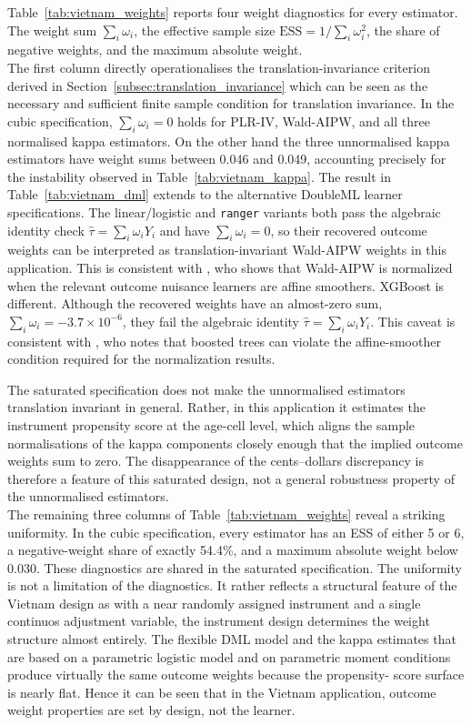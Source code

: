 \documentclass[12pt, a4paper, oneside]{article}
\theoremstyle{plain}
\theoremstyle{definition}
\begin{document}
Table~\ref{tab:vietnam_weights} reports four weight diagnostics for every
estimator. The weight sum $\sum_i \omega_i$, the effective sample size
$\text{ESS} = 1/\sum_i \omega_i^2$, the share of negative weights, and the
maximum absolute weight. \\
The first column directly operationalises the translation-invariance criterion derived in
Section~\ref{subsec:translation_invariance} which can be seen as the necessary and sufficient finite sample condition for translation invariance.
In the cubic specification, $\sum_i\omega_i = 0$ holds 
for PLR-IV, Wald-AIPW, and all three normalised kappa estimators.
On the other hand the three
unnormalised kappa estimators have weight sums between 0.046 and 0.049,
accounting precisely for the instability observed in Table~\ref{tab:vietnam_kappa}.
 The result in Table~\ref{tab:vietnam_dml} extends to the alternative
DoubleML learner specifications. The linear/logistic and \texttt{ranger}
variants both pass the algebraic identity check
\(\hat\tau=\sum_i\omega_iY_i\) and have \(\sum_i\omega_i=0\), so their
recovered outcome weights can be interpreted as translation-invariant
Wald-AIPW weights in this application. This is consistent with
\citet{knaus2024treatment}, who shows that Wald-AIPW is normalized when
the relevant outcome nuisance learners are affine smoothers.
XGBoost is different. Although the recovered weights have an almost-zero
sum, \(\sum_i\omega_i=-3.7\times10^{-6}\), they fail the algebraic identity
\(\hat\tau=\sum_i\omega_iY_i\).
This caveat is consistent with
\citet{knaus2024treatment}, who notes that boosted trees can violate the
affine-smoother condition required for the normalization results.


The saturated specification does not make the unnormalised estimators translation invariant in general. Rather, in this application it estimates the instrument propensity score at the age-cell level, which aligns the sample normalisations of the kappa components closely enough that the implied outcome weights sum to zero. The disappearance of the cents--dollars discrepancy is therefore a feature of this saturated design, not a general robustness property of the unnormalised estimators.\\
The remaining three columns of Table~\ref{tab:vietnam_weights} reveal a
striking uniformity. In the cubic specification, every estimator has an ESS
of either 5 or 6, a negative-weight share of exactly 54.4\%, and a maximum
absolute weight below 0.030. These diagnostics are shared in the saturated specification.
The uniformity is not a limitation of the diagnostics. It rather reflects a structural feature of the Vietnam design as with a near randomly assigned instrument and a single continuos adjustment variable, the instrument design determines the weight structure almost entirely. 
The flexible
DML model and the kappa estimates that are based on a parametric logistic model and on parametric moment conditions produce virtually the same outcome weights because the propensity-
score surface is nearly flat.
Hence it can be seen that in the Vietnam application, outcome weight properties are set by design, not the learner.
\end{document}
